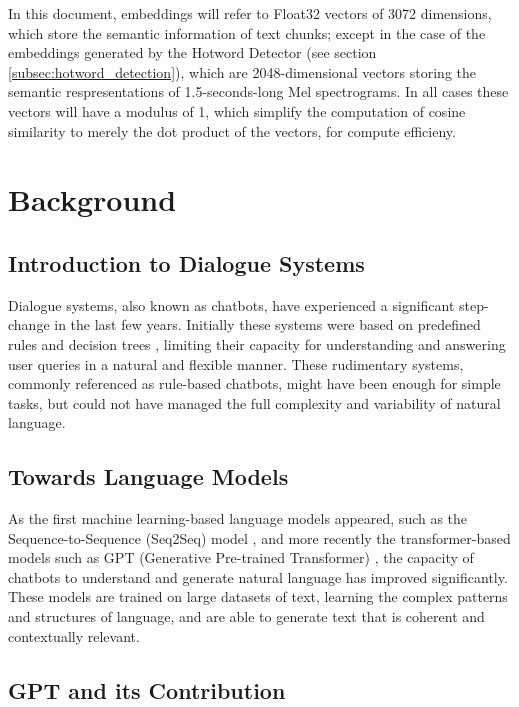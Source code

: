 \documentclass[a4paper,12pt,twoside]{ThesisStyle}
\begin{document}
\begin{itemize}
  In this document, embeddings will refer to Float32 vectors of 3072 dimensions, which store the semantic information of text chunks; except in the case of the embeddings generated by the Hotword Detector (see section \ref{subsec:hotword_detection}), which are 2048-dimensional vectors storing the semantic respresentations of 1.5-seconds-long Mel spectrograms. In all cases these vectors will have a modulus of 1, which simplify the computation of cosine similarity to merely the dot product of the vectors, for compute efficieny.
\end{itemize}

\chapter{Background}
\label{cap:background}

\section{Introduction to Dialogue Systems}
\label{sec:chat}

Dialogue systems, also known as chatbots, have experienced a significant step-change in the last few years. Initially these systems were based on predefined rules and decision trees \cite{Weizenbaum1966ELIZA, AbuShawar2015ALICE}, limiting their capacity for understanding and answering user queries in a natural and flexible manner. These rudimentary systems, commonly referenced as rule-based chatbots, might have been enough for simple tasks, but could not have managed the full complexity and variability of natural language.

\section{Towards Language Models}
\label{sec:language}

As the first machine learning-based language models appeared, such as the Sequence-to-Sequence (Seq2Seq) model \cite{Sutskever2014SequenceSequenceLearningNeural}, and more recently the transformer-based models such as GPT (Generative Pre-trained Transformer) \cite{Vaswani2023AttentionNeed, Radford2018GPT1}, the capacity of chatbots to understand and generate natural language has improved significantly. These models are trained on large datasets of text, learning the complex patterns and structures of language, and are able to generate text that is coherent and contextually relevant.

\section{GPT and its Contribution}
\label{sec:gpt}
\end{document}
